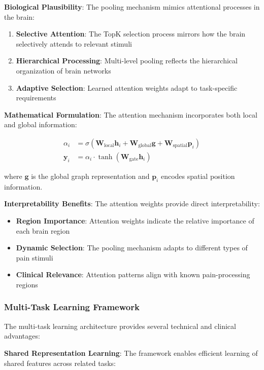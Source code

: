 \textbf{Biological Plausibility}:
The pooling mechanism mimics attentional processes in the brain:

\begin{enumerate}
\item \textbf{Selective Attention}: The TopK selection process mirrors how the brain selectively attends to relevant stimuli
\item \textbf{Hierarchical Processing}: Multi-level pooling reflects the hierarchical organization of brain networks
\item \textbf{Adaptive Selection}: Learned attention weights adapt to task-specific requirements
\end{enumerate}

\textbf{Mathematical Formulation}:
The attention mechanism incorporates both local and global information:

\begin{align}
\alpha_i &= \sigma\left(\mathbf{W}_{\text{local}} \mathbf{h}_i + \mathbf{W}_{\text{global}} \mathbf{g} + \mathbf{W}_{\text{spatial}} \mathbf{p}_i\right) \\
\mathbf{y}_i &= \alpha_i \cdot \tanh\left(\mathbf{W}_{\text{gate}} \mathbf{h}_i\right)
\end{align}

where $\mathbf{g}$ is the global graph representation and $\mathbf{p}_i$ encodes spatial position information.

\textbf{Interpretability Benefits}:
The attention weights provide direct interpretability:

\begin{itemize}
\item \textbf{Region Importance}: Attention weights indicate the relative importance of each brain region
\item \textbf{Dynamic Selection}: The pooling mechanism adapts to different types of pain stimuli
\item \textbf{Clinical Relevance}: Attention patterns align with known pain-processing regions
\end{itemize}

\subsubsection{Multi-Task Learning Framework}

The multi-task learning architecture provides several technical and clinical advantages:

\textbf{Shared Representation Learning}:
The framework enables efficient learning of shared features across related tasks:

